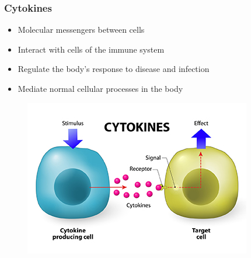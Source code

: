 \documentclass{beamer}
\begin{document}
\begin{frame}
\frametitle{Cytokines}
\begin{itemize}
    \item Molecular messengers between cells
    \item Interact with cells of the immune system
    \item Regulate the body's response to disease and infection
    \item Mediate normal cellular processes in the body
\end{itemize}
\begin{figure}
    \centering
    \includegraphics[width=0.5\linewidth]{cytokines.jpg}
\end{figure}
\end{frame}

\end{document}
